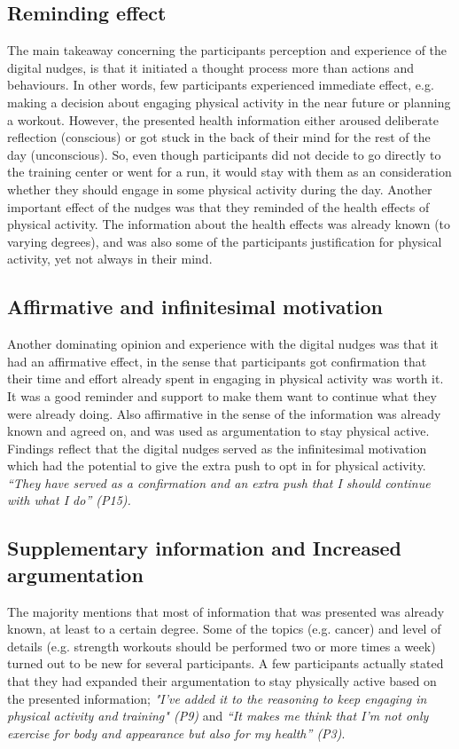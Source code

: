 \subsection{Reminding effect }
The main takeaway concerning the participants perception and experience of the digital nudges, is that it initiated a thought process more than actions and behaviours. In other words, few participants experienced immediate effect, e.g. making a decision about engaging physical activity in the near future or planning a workout. However, the presented health information either aroused deliberate reflection (conscious) or got stuck in the back of their mind for the rest of the day (unconscious). So, even though participants did not decide to go directly to the training center or went for a run, it would stay with them as an consideration whether they should engage in some physical activity during the day. Another important effect of the nudges was that they reminded of the health effects of physical activity. The information about the health effects was already known (to varying degrees), and was also some of the participants justification for physical activity, yet not always in their mind. 

\subsection{Affirmative and infinitesimal motivation}
Another dominating opinion and experience with the digital nudges was that it had an affirmative effect, in the sense that participants got confirmation that their time and effort already spent in engaging in physical activity was worth it. It was a good reminder and support to make them want to continue what they were already doing. Also affirmative in the sense of the information was already known and agreed on, and was used as argumentation to stay physical active. Findings reflect that the digital nudges served as the infinitesimal motivation which had the potential to give the extra push to opt in for  physical activity. \textit{“They have served as a confirmation and an extra push that I should continue with what I do” (P15).}

\subsection{Supplementary information and Increased argumentation}
The majority mentions that most of information that was presented was already known, at least to a certain degree. Some of the topics (e.g. cancer) and level of details (e.g. strength workouts should be performed two or more times a week) turned out to be new for several participants. A few participants actually stated that they had expanded their argumentation to stay physically active based on the presented information; \textit{"I've added it to the reasoning to keep engaging in physical activity and training" (P9)} and \textit{“It makes me think that I'm not only exercise for body and appearance but also for my health” (P3)}.

